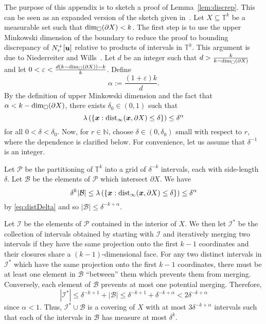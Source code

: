 \documentclass[12pt,a4paper]{amsart}
\numberwithin{equation}{section}
\theoremstyle{definition}
\begin{document}
The purpose of this appendix is to sketch a proof of Lemma~\ref{lem:discrep}.  This can be seen as an expanded version of the sketch given in~\cite[pp.~677--678]{GrabowskiMathePikhurko17}. Let $X \subseteq\mathbb{T}^k$ be a measurable set such that $\operatorname{dim}_\square(\partial X)<k$. The first step is to use the upper Minkowski dimension of the boundary to reduce the proof to bounding discrepancy of $N_r^+[\boldsymbol{u}]$ relative to products of intervals in $\mathbb{T}^k$. This argument is due to Niederreiter and Wills~\cite[Kollorar~4]{NiederreiterWills75}. Let $d$ be an integer such that $d>\frac{k}{k-\operatorname{dim}_\square(\partial X)}$ and let $0 <\varepsilon<\frac{d(k-\operatorname{dim}_\square(\partial X))-k}{k}$. Define
\[\alpha:=\frac{(1+\varepsilon)k}{d}.\]
By the definition of upper Minkowski dimension and the fact that $\alpha<k-\operatorname{dim}_\square(\partial X)$, there exists $\delta_0\in (0,1)$ such that
\begin{equation}\label{eq:distDelta}\lambda\left(\left\{\boldsymbol{x}: \operatorname{dist}_\infty(\boldsymbol{x},\partial X)\leq \delta\right\}\right)\leq \delta^\alpha\end{equation}
for all $0<\delta<\delta_0$. Now, for $r\in \mathbb{N}$, choose $\delta\in (0,\delta_0)$ small with respect to $r$, where the dependence is clarified below. For convenience, let us assume that $\delta^{-1}$ is an integer. 

Let $\mathcal{P}$ be the partitioning of $\mathbb{T}^k$ into a grid of $\delta^{-k}$ intervals, each with side-length $\delta$. Let $\mathcal{B}$ be the elements of $\mathcal{P}$ which intersect $\partial X$. We have 
\[\delta^k|\mathcal{B}|\leq\lambda\left(\left\{\boldsymbol{x}: \operatorname{dist}_\infty(\boldsymbol{x},\partial X)\leq \delta\right\}\right)\leq  \delta^\alpha\]
by \eqref{eq:distDelta} and so $|\mathcal{B}|\leq \delta^{-k+\alpha}$. 

Let $\mathcal{I}$ be the elements of $\mathcal{P}$ contained in the interior of $X$. We then let $\mathcal{I}^*$ be the collection of intervals obtained by starting with $\mathcal{I}$ and iteratively merging two intervals if they have the same projection onto the first $k-1$ coordinates and their closures share a $(k-1)$-dimensional face. For any two distinct intervals in $\mathcal{I}^*$ which have the same projection onto the first $k-1$ coordinates, there must be at least one element in $\mathcal{B}$ ``between'' them which prevents them from merging. Conversely, each element of $\mathcal{B}$ prevents at most one potential merging. Therefore,
\[|\mathcal{I}^*|\leq \delta^{-k+1} + |\mathcal{B}|\leq \delta^{-k+1}+\delta^{-k+\alpha}< 2\delta^{-k+\alpha}\]
since $\alpha<1$. Thus, $\mathcal{I}^*\cup\mathcal{B}$ is a covering of $X$ with at most $3\delta^{-k+\alpha}$ intervals such that each of the intervals in $\mathcal{B}$ has measure at most $\delta^{k}$. 
\end{document}
